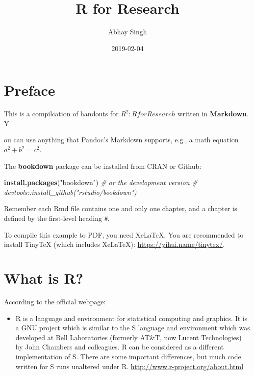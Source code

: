 \documentclass[]{book}
\title{R for Research}
\author{Abhay Singh}
\date{2019-02-04}
\newenvironment{Shaded}{\begin{snugshade}}{\end{snugshade}}
\newcommand{\KeywordTok}[1]{\textcolor[rgb]{0.13,0.29,0.53}{\textbf{#1}}}
\newcommand{\StringTok}[1]{\textcolor[rgb]{0.31,0.60,0.02}{#1}}
\newcommand{\CommentTok}[1]{\textcolor[rgb]{0.56,0.35,0.01}{\textit{#1}}}
\newcommand{\NormalTok}[1]{#1}
\providecommand{\tightlist}{%
  \setlength{\itemsep}{0pt}\setlength{\parskip}{0pt}}
\begin{document}
\maketitle

{
\setcounter{tocdepth}{1}
\tableofcontents
}
\chapter{Preface}\label{preface}

This is a compilcation of handouts for \emph{\(R^2: R for Research\)}
written in \textbf{Markdown}. Y

ou can use anything that Pandoc's Markdown supports, e.g., a math
equation \(a^2 + b^2 = c^2\).

The \textbf{bookdown} package can be installed from CRAN or Github:

\begin{Shaded}
\begin{Highlighting}[]
\KeywordTok{install.packages}\NormalTok{(}\StringTok{"bookdown"}\NormalTok{)}
\CommentTok{# or the development version}
\CommentTok{# devtools::install_github("rstudio/bookdown")}
\end{Highlighting}
\end{Shaded}

Remember each Rmd file contains one and only one chapter, and a chapter
is defined by the first-level heading \texttt{\#}.

To compile this example to PDF, you need XeLaTeX. You are recommended to
install TinyTeX (which includes XeLaTeX):
\url{https://yihui.name/tinytex/}.

\chapter{What is R?}\label{what-is-r}

According to the official webpage:

\begin{itemize}
\tightlist
\item
  R is a language and environment for statistical computing and
  graphics. It is a GNU project which is similar to the S language and
  environment which was developed at Bell Laboratories (formerly AT\&T,
  now Lucent Technologies) by John Chambers and colleagues. R can be
  considered as a different implementation of S. There are some
  important differences, but much code written for S runs unaltered
  under R. \url{http://www.r-project.org/about.html}
\end{itemize}
\end{document}

